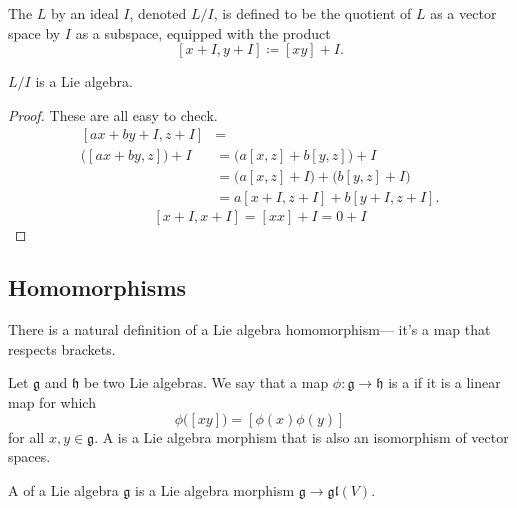 \documentclass{article}
\newcommand{\lb}[1]{\ensuremath{\left[{#1}\right]}}
\newcommand{\frkg}{\ensuremath{\mathfrak{g}}}
\newcommand{\frkh}{\ensuremath{\mathfrak{h}}}
\newcommand{\glalg}{\ensuremath{\mathfrak{gl}}}
\begin{document}
\begin{definition}
    The  $L$ by an ideal $I$, denoted $L/I$, is defined to be the quotient of $L$ as a vector space by $I$ as a subspace, equipped with the product
    \[
        \lb{x+I,y+I}
        \coloneq
        \lb{xy} + I.
    \]
\end{definition}

\begin{proposition}
    $L/I$ is a Lie algebra.
\end{proposition}
\begin{proof}
    These are all easy to check.
    \begin{align*}
        \lb{ax+by+I,z+I}
        &=
        \\
        \Big(\lb{ax+by,z}\Big) + I
        &=
        \Big(
            a\lb{x,z}  
            +
            b\lb{y,z}  
        \Big)
        + I
        \\
        &=
        \Big(
            a\lb{x,z} + I
        \Big)
        +
        \Big(
            b\lb{y,z} + I 
        \Big)
        \\
        &=
        a\lb{x+I,z+I} + b\lb{y+I,z+I}.
    \end{align*}
    \[
        \lb{x+I,x+I}
        =
        \lb{xx} + I
        =
        0 + I
    \]
\end{proof}

\newcommand{\barphi}{\ensuremath{\overline{\phi}}}

\subsection{Homomorphisms}

There is a natural definition of a Lie algebra homomorphism--- it's a map that respects brackets.

\begin{definition}
    Let $\frkg$ and $\frkh$ be two Lie algebras.
    We say that a map $\phi: \frkg \to \frkh$ is a  if it is a linear map for which
    \[
        \phi\Big(\lb{xy}\Big)
        =
        \lb{\phi(x)\phi(y)}
    \]
    for all $x,y \in \frkg$. 
    A  is a Lie algebra morphism that is also an isomorphism of vector spaces.
\end{definition}


\begin{definition}
    A  of a Lie algebra $\frkg$ is a Lie algebra morphism $\frkg \to \glalg(V)$.
\end{definition}
\end{document}
